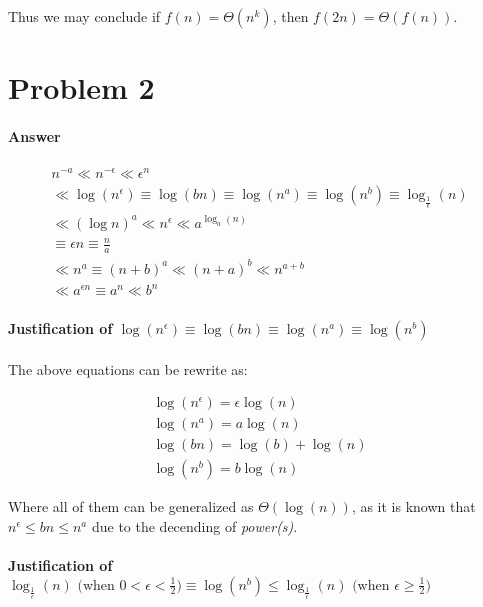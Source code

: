 \documentclass[12pt]{article}
\begin{document}
Thus we may conclude if $f(n) = \Theta(n^k)$, then $f(2n) = \Theta(f(n))$.

\section{Problem 2}

\paragraph{Answer}

\begin{gather}
     n^{-a} \ll n^{-\epsilon} \ll \epsilon^n  \\
    \ll \log(n^\epsilon) \equiv \log(bn) \equiv \log(n^a) \equiv \log(n^b) \equiv \log_{\frac{1}{\epsilon}}(n)\\
    \ll  (\log n)^a \ll n^{\epsilon} \ll a^{\log_a(n)} \\
    \equiv \epsilon n \equiv \frac{n}{a} \\
    \ll n^a \equiv (n+b)^a \ll (n+a)^b \ll n^{a+b} \\
    \ll a^{\epsilon n} \equiv a^n \ll b^n
\end{gather}


\paragraph{Justification of $\log(n^\epsilon) \equiv \log(bn) \equiv \log(n^a) \equiv \log(n^b)$\newline}

The above equations can be rewrite as:

\begin{gather}
    \log(n^\epsilon) = \epsilon \log(n) \\
    \log(n^a) = a \log(n) \\
    \log(bn) = \log(b) + \log(n) \\
    \log(n^b) = b \log(n)
\end{gather}

Where all of them can be generalized as $\Theta(\log(n))$, as it is known that $n^\epsilon \leq bn \leq n^a$ due to the decending of \textit{power(s)}.

\paragraph{Justification of $ \log_{\frac{1}{\epsilon}}(n) \text{ \ (when $0 < \epsilon < \frac{1}{2}$)} \equiv \log(n^b) \leq \log_{\frac{1}{\epsilon}}(n) \text{ \ (when $\epsilon \geq \frac{1}{2}$)}$\newline}
\end{document}
